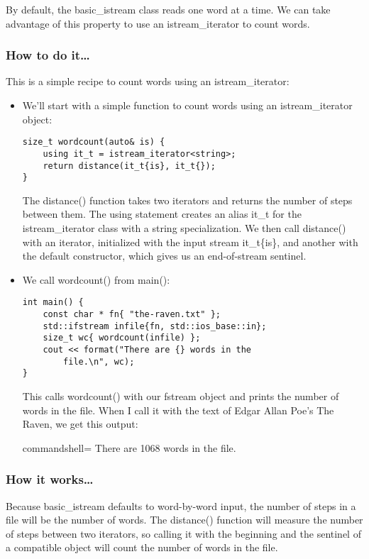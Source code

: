 
By default, the basic\_istream class reads one word at a time. We can take advantage of this property to use an istream\_iterator to count words.

\subsubsection{How to do it…}

This is a simple recipe to count words using an istream\_iterator:

\begin{itemize}
\item 
We'll start with a simple function to count words using an istream\_iterator object:

\begin{lstlisting}[style=styleCXX]
size_t wordcount(auto& is) {
	using it_t = istream_iterator<string>;
	return distance(it_t{is}, it_t{});
}
\end{lstlisting}

The distance() function takes two iterators and returns the number of steps between them. The using statement creates an alias it\_t for the istream\_iterator class with a string specialization. We then call distance() with an iterator, initialized with the input stream it\_t\{is\}, and another with the default constructor, which gives us an end-of-stream sentinel.

\item 
We call wordcount() from main():

\begin{lstlisting}[style=styleCXX]
int main() {
	const char * fn{ "the-raven.txt" };
	std::ifstream infile{fn, std::ios_base::in};
	size_t wc{ wordcount(infile) };
	cout << format("There are {} words in the
		file.\n", wc);
}
\end{lstlisting}

This calls wordcount() with our fstream object and prints the number of words in the file. When I call it with the text of Edgar Allan Poe's The Raven, we get this output:

\begin{tcblisting}{commandshell={}}
There are 1068 words in the file.
\end{tcblisting}
\end{itemize}

\subsubsection{How it works…}

Because basic\_istream defaults to word-by-word input, the number of steps in a file will be the number of words. The distance() function will measure the number of steps between two iterators, so calling it with the beginning and the sentinel of a compatible object will count the number of words in the file.
